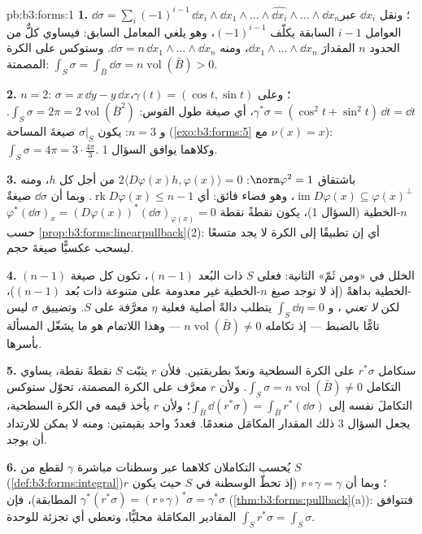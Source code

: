 \begin{solution}{pb:b3:forms:1}
\textbf{1.} $\dd\sigma = \sum_i(-1)^{i-1}\,\dd x_i\wedge\dd
x_1\wedge\dots\wedge\widehat{\dd x_i}\wedge\dots\wedge\dd
x_n$؛ ونقل $\dd x_i$ عبر العوامل $i-1$ السابقة
يكلّف $(-1)^{i-1}$، وهو يلغي المعامل السابق: فيساوي كلٌّ من
الحدود $n$ المقدارَ $\dd x_1\wedge\dots\wedge\dd x_n$، ومنه $\dd\sigma = n\,\dd x_1\wedge\dots\wedge\dd x_n$. وستوكس على الكرة
المصمتة: $\int_S\sigma = \int_{\bar B}\dd\sigma =
n\operatorname{vol}(\bar B) > 0$.

\textbf{2.} $n = 2$: $\sigma = x\,\dd y - y\,\dd x$؛ وعلى $\gamma(t) = (\cos t, \sin t)$، $\gamma^*\sigma = (\cos^2t +
\sin^2t)\,\dd t = \dd t$، أي صيغة
طول القوس: $\int_S\sigma = 2\pi = 2\operatorname{vol}(\bar B^2)$. و $n = 3$: يكون $\sigma\vert_S$ صيغةَ
المساحة (\cref{exo:b3:forms:5} مع $\nu(x) = x$): $\int_S\sigma = 4\pi = 3\cdot\tfrac{4\pi}3$. وكلاهما يوافق
السؤال 1.

\textbf{3.} باشتقاق $\norm\varphi^2 = 1$: $2\langle
D\varphi(x)h, \varphi(x)\rangle = 0$ من أجل كل $h$، ومنه
$\operatorname{im}D\varphi(x) \subseteq \varphi(x)^\perp$، وهو فضاء فائق: أي $\operatorname{rk}D\varphi(x) \leq n - 1$. وبما أن $\dd\sigma$ صيغةٌ
$n$-الخطية (السؤال 1)، يكون نقطةً نقطة $\varphi^*(\dd\sigma)_x =
(D\varphi(x))^*(\dd\sigma)_{\varphi(x)} = 0$ حسب
\cref{prop:b3:forms:linearpullback}(2): أي إن تطبيقًا إلى الكرة لا يجد متسعًا ليسحب
عكسيًّا صيغةَ حجم.

\textbf{4.} الخلل في «ومن ثَمّ» الثانية: فعلى $S$ ذات البُعد
$(n-1)$، تكون كل صيغة $(n-1)$-الخطية  بداهةً (إذ لا توجد
صيغ $n$-الخطية غير معدومة على متنوعة ذات بُعد $(n-1)$)، لكن
\emph{ لا تعني }، و $\int_S\dd\eta = 0$ يتطلب دالةً أصلية
فعلية $\eta$ معرَّفة على $S$. وتضييق $\sigma$ ليس تامًّا
بالضبط --- إذ تكامله $n\operatorname{vol}(\bar B) \neq
0$ --- وهذا اللاتمام هو ما يشغّل
المسألة بأسرها.

\textbf{5.} سنكامل $r^*\sigma$ على الكرة السطحية ونعدّ
بطريقتين. فلأن $r$ يثبّت $S$ نقطةً نقطة، يساوي التكامل $\int_S\sigma = n\operatorname{vol}(\bar B)
\neq 0$.
ولأن $r$ معرَّف على الكرة المصمتة، تحوّل ستوكس التكاملَ نفسه
إلى $\int_{\bar B}\dd(r^*\sigma) =
\int_{\bar B}r^*(\dd\sigma)$؛ ولأن $r$ يأخذ قيمه في الكرة السطحية، يجعل السؤال
3 ذلك المقدار المكامَل منعدمًا. فعددٌ واحد بقيمتين: ومنه لا
يمكن للارتداد أن يوجد.

\textbf{6.} يُحسب التكاملان كلاهما عبر وسطنات مباشرة $\gamma$
لقطع من $S$ (\cref{def:b3:forms:integral})؛ وبما أن $r\circ\gamma =
\gamma$ (إذ تحطّ الوسطنة في
$S$ حيث يكون $r$ المطابقة)، فإن $\gamma^*(r^*\sigma) = (r\circ\gamma)^*\sigma =
\gamma^*\sigma$ (\cref{thm:b3:forms:pullback}(a)):
فتتوافق المقادير المكامَلة محليًّا، وتعطي أي تجزئة للوحدة
$\int_Sr^*\sigma = \int_S\sigma$.


\end{solution}
